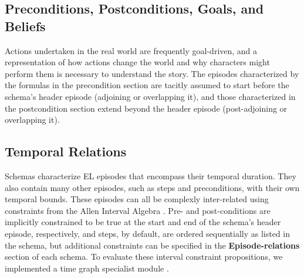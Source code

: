 \subsection{Preconditions, Postconditions, Goals, and Beliefs}
\label{sec:preconds}
Actions undertaken in the real world are frequently goal-driven, and a representation of how actions change the world and why characters might perform them is necessary to understand the story. The episodes characterized by the formulas in the precondition section are tacitly assumed to start before the schema's header episode (adjoining or overlapping it), and those characterized in the postcondition section extend beyond the header episode (post-adjoining or overlapping it).

\subsection{Temporal Relations}
\label{sec:eprels}
Schemas characterize EL episodes that encompass their temporal duration. They also contain many other episodes, such as steps and preconditions, with their own temporal bounds. These episodes can all be complexly inter-related using constraints from the Allen Interval Algebra \citep{allen1983maintaining}. Pre- and post-conditions are implicitly constrained to be true at the start and end of the schema's header episode, respectively, and steps, by default, are ordered sequentially as listed in the schema, but additional constraints can be specified in the \textbf{Episode-relations} section of each schema. To evaluate these interval constraint propositions, we implemented a time graph specialist module \citep{gerevini1993efficient}.

